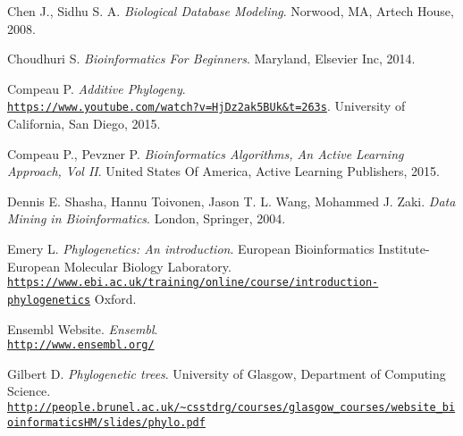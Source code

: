 \documentclass[twoside,openright,titlepage,fleqn,
,	headinclude,12pt,a4paper,BCOR5mm,footinclude,table]{scrbook}
\newcommand{\?}{'\-\nobreak\hspace{0pt}}
\begin{document}
\begin{thebibliography}{60}
Chen J., Sidhu S. A.\newline
\textit{Biological Database Modeling}.\newline
Norwood, MA, Artech House, 2008.

Choudhuri S. \newline
\textit{Bioinformatics For Beginners}. \newline
Maryland, Elsevier Inc, 2014.

Compeau P.\newline
\textit{Additive Phylogeny}.
\\\texttt{\url{https://www.youtube.com/watch?v=HjDz2ak5BUk&t=263s}}.\newline
University of California, San Diego, 2015.

Compeau P., Pevzner P. \newline
\textit{Bioinformatics Algorithms, An Active Learning Approach, Vol II}. \newline
United States Of America, Active Learning Publishers, 2015.

Dennis E. Shasha, Hannu Toivonen, Jason T. L. Wang, Mohammed J. Zaki. \newline
\textit{Data Mining in Bioinformatics}.\newline
London, Springer, 2004.

Emery L.\newline
\textit{Phylogenetics: An introduction}.\newline
European Bioinformatics Institute-European Molecular Biology Laboratory.
\\\texttt{\url{https://www.ebi.ac.uk/training/online/course/introduction-phylogenetics}}\newline
Oxford.

Ensembl Website.\newline
\textit{Ensembl}.
\\\texttt{\url{http://www.ensembl.org/}}

Gilbert D. \newline
\textit{Phylogenetic trees}.\newline
University of Glasgow, Department of Computing Science.
\\\texttt{\url{http://people.brunel.ac.uk/~csstdrg/courses/glasgow_courses/website_bioinformaticsHM/slides/phylo.pdf}}


\end{thebibliography}
\end{document}
